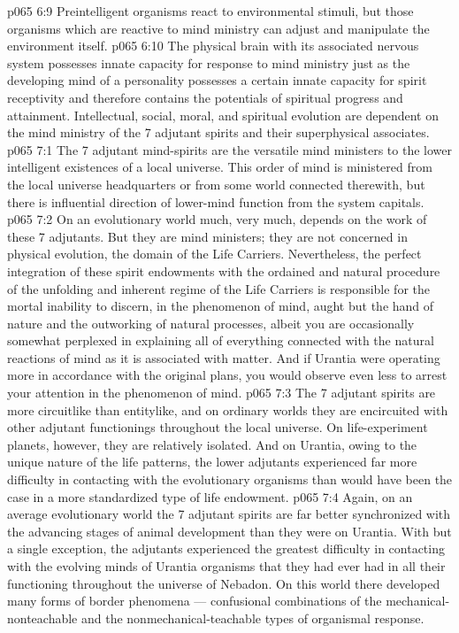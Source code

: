 \vs p065 6:9 Preintelligent organisms react to environmental stimuli, but those organisms which are reactive to mind ministry can adjust and manipulate the environment itself.
\vs p065 6:10 The physical brain with its associated nervous system possesses innate capacity for response to mind ministry just as the developing mind of a personality possesses a certain innate capacity for spirit receptivity and therefore contains the potentials of spiritual progress and attainment. Intellectual, social, moral, and spiritual evolution are dependent on the mind ministry of the 7 adjutant spirits and their superphysical associates.
\vs p065 7:1 The 7 adjutant mind\hyp{}spirits are the versatile mind ministers to the lower intelligent existences of a local universe. This order of mind is ministered from the local universe headquarters or from some world connected therewith, but there is influential direction of lower\hyp{}mind function from the system capitals.
\vs p065 7:2 On an evolutionary world much, very much, depends on the work of these 7 adjutants. But they are mind ministers; they are not concerned in physical evolution, the domain of the Life Carriers. Nevertheless, the perfect integration of these spirit endowments with the ordained and natural procedure of the unfolding and inherent regime of the Life Carriers is responsible for the mortal inability to discern, in the phenomenon of mind, aught but the hand of nature and the outworking of natural processes, albeit you are occasionally somewhat perplexed in explaining all of everything connected with the natural reactions of mind as it is associated with matter. And if Urantia were operating more in accordance with the original plans, you would observe even less to arrest your attention in the phenomenon of mind.
\vs p065 7:3 The 7 adjutant spirits are more circuitlike than entitylike, and on ordinary worlds they are encircuited with other adjutant functionings throughout the local universe. On life\hyp{}experiment planets, however, they are relatively isolated. And on Urantia, owing to the unique nature of the life patterns, the lower adjutants experienced far more difficulty in contacting with the evolutionary organisms than would have been the case in a more standardized type of life endowment.
\vs p065 7:4 Again, on an average evolutionary world the 7 adjutant spirits are far better synchronized with the advancing stages of animal development than they were on Urantia. With but a single exception, the adjutants experienced the greatest difficulty in contacting with the evolving minds of Urantia organisms that they had ever had in all their functioning throughout the universe of Nebadon. On this world there developed many forms of border phenomena --- confusional combinations of the mechanical\hyp{}nonteachable and the nonmechanical\hyp{}teachable types of organismal response.
